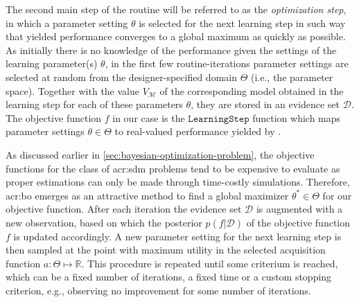 The second main step of the routine will be referred to as the \textit{optimization step}, in which a parameter setting $\theta$ is selected for the next learning step in such way that yielded performance converges to a global maximum as quickly as possible.
As initially there is no knowledge of the performance given the settings of the learning parameter(s) $\theta$, in the first few routine-iterations parameter settings are selected at random from the designer-specified domain $\Theta$ (i.e., the parameter space).
Together with the value $V_{\mathcal{M}}$ of the corresponding model obtained in the learning step for each of these parameters $\theta$, they are stored in an evidence set $\mathcal{D}$.
The objective function $f$ in our case is the $\texttt{LearningStep}$ function which maps parameter settings $\theta \in \Theta$ to real-valued performance yielded by .

As discussed earlier in  \autoref{sec:bayesian-optimization-problem}, the objective functions for the class of \acrshort{acr:sdm} problems tend to be expensive to evaluate as proper estimations can only be made through time-costly simulations.
Therefore, \acrlong{acr:bo} emerges as an attractive method to find a global maximizer $\theta^\ast \in \Theta$ for our objective function.
After each iteration the evidence set $\mathcal{D}$ is augmented with a new observation, based on which the posterior $p(f\vert \mathcal{D})$ of the objective function $f$ is updated accordingly.
A new parameter setting for the next learning step is then sampled at the point with maximum utility in the selected acquisition function $a: \Theta \mapsto \mathbb{R}$.
This procedure is repeated until some criterium is reached, which can be a fixed number of iterations, a fixed time or a custom stopping criterion, e.g., observing no improvement for some number of iterations.



